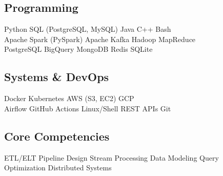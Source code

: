 \documentclass[../main.tex]{subfiles}
\begin{document}
\subsection{Programming}
Python \textbullet{} SQL (PostgreSQL, MySQL) \textbullet{} Java \textbullet{} C++ \textbullet{} Bash \\
Apache Spark (PySpark) \textbullet{} Apache Kafka \textbullet{} Hadoop \textbullet{} MapReduce \\
PostgreSQL \textbullet{} BigQuery \textbullet{} MongoDB \textbullet{} Redis \textbullet{} SQLite \\

\subsection{Systems \& DevOps}
Docker \textbullet{} Kubernetes \textbullet{} AWS (S3, EC2) \textbullet{} GCP \\
Airflow \textbullet{} GitHub Actions \textbullet{} Linux/Shell \textbullet{} REST APIs \textbullet{} Git \\

\subsection{Core Competencies}
ETL/ELT Pipeline Design \textbullet{} Stream Processing \textbullet{} Data Modeling \textbullet{} Query Optimization \textbullet{} Distributed Systems
\end{document}

